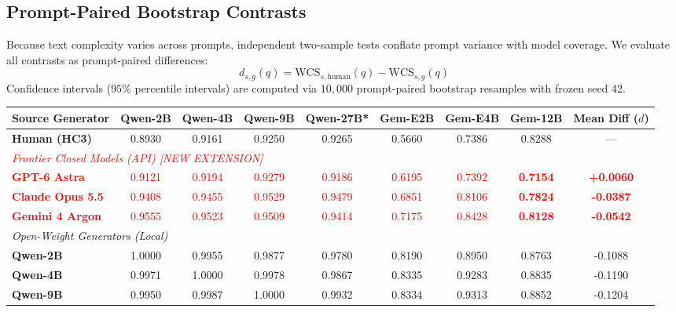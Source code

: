 \documentclass[11pt,a4paper,twocolumn]{article}
\newcommand{\diff}[1]{\textcolor{red}{#1}}
\begin{document}
\subsection{Prompt-Paired Bootstrap Contrasts}
Because text complexity varies across prompts, independent two-sample tests conflate prompt variance with model coverage. We evaluate all contrasts as prompt-paired differences:
\begin{equation}
d_{s,g}(q) = \text{WCS}_{s,\text{human}}(q) - \text{WCS}_{s,g}(q)
\end{equation}
Confidence intervals ($95\%$ percentile intervals) are computed via $10,000$ prompt-paired bootstrap resamples with frozen seed 42.

\begin{table}[t]
\centering
\footnotesize
\setlength{\tabcolsep}{4.5pt}
\begin{tabular}{lcccccccc}
\toprule
\textbf{Source Generator} & \textbf{Qwen-2B} & \textbf{Qwen-4B} & \textbf{Qwen-9B} & \textbf{Qwen-27B*} & \textbf{Gem-E2B} & \textbf{Gem-E4B} & \textbf{Gem-12B} & \textbf{Mean Diff ($d$)} \\
\midrule
\textbf{Human (HC3)} & 0.8930 & 0.9161 & 0.9250 & 0.9265 & 0.5660 & 0.7386 & 0.8288 & --- \\
\midrule
\multicolumn{9}{l}{\diff{\textit{Frontier Closed Models (API) [NEW EXTENSION]}}} \\
\diff{\textbf{GPT-6 Astra}} & \diff{0.9121} & \diff{0.9194} & \diff{0.9279} & \diff{0.9186} & \diff{0.6195} & \diff{0.7392} & \diff{\textbf{0.7154}} & \diff{\textbf{+0.0060}} \\
\diff{\textbf{Claude Opus 5.5}} & \diff{0.9408} & \diff{0.9455} & \diff{0.9529} & \diff{0.9479} & \diff{0.6851} & \diff{0.8106} & \diff{\textbf{0.7824}} & \diff{\textbf{-0.0387}} \\
\diff{\textbf{Gemini 4 Argon}} & \diff{0.9555} & \diff{0.9523} & \diff{0.9509} & \diff{0.9414} & \diff{0.7175} & \diff{0.8428} & \diff{\textbf{0.8128}} & \diff{\textbf{-0.0542}} \\
\midrule
\multicolumn{9}{l}{\textit{Open-Weight Generators (Local)}} \\
\textbf{Qwen-2B} & 1.0000 & 0.9955 & 0.9877 & 0.9780 & 0.8190 & 0.8950 & 0.8763 & -0.1088 \\
\textbf{Qwen-4B} & 0.9971 & 1.0000 & 0.9978 & 0.9867 & 0.8335 & 0.9283 & 0.8835 & -0.1190 \\
\textbf{Qwen-9B} & 0.9950 & 0.9987 & 1.0000 & 0.9932 & 0.8334 & 0.9313 & 0.8852 & -0.1204 \\

\end{tabular}
\end{table}
\end{document}
